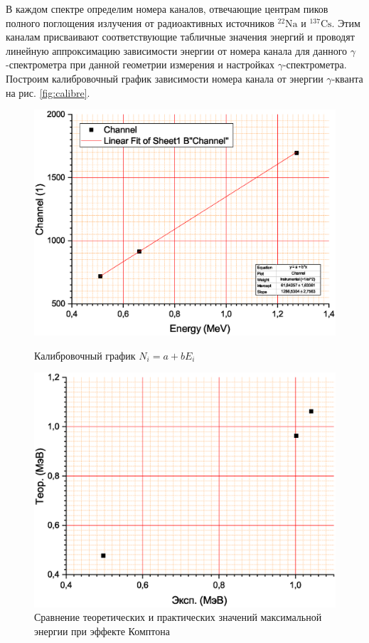 \documentclass[a4paper]{article}
\newcommand{\isotope}[2]{$ ^{#2}\mathrm{#1} $}
\begin{document}
В каждом спектре определим номера каналов, отвечающие центрам пиков полного поглощения излучения от радиоактивных источников \isotope{Na}{22} и \isotope{Cs}{137}. Этим каналам присваивают соответствующие табличные значения энергий и проводят линейную аппроксимацию зависимости энергии от номера канала для данного $\gamma$-спектрометра при данной геометрии измерения и настройках $\gamma$-спектрометра. Построим калибровочный график зависимости номера канала от энергии $\gamma$-кванта на рис. \ref{fig:calibre}.
\begin{figure}
	\centering
	\begin{minipage}{0.49\linewidth}
		\centering
		\includegraphics[width=1\linewidth]{calibre}
		\caption{Калибровочный график $N_i = a + b E_i $}
		\label{fig:calibre}
	\end{minipage}
	\hfill
	\begin{minipage}{0.49\linewidth}
				\centering
		\includegraphics[width=1\linewidth]{Сравнение}
		\caption{Сравнение теоретических и практических значений максимальной энергии при эффекте Комптона}
		\label{fig:comp}
	\end{minipage}
\end{figure}
\end{document}
